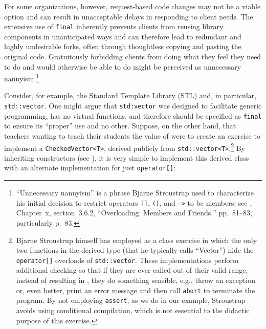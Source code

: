 {For some organizations, however, request-based code changes may not be a
viable option and can result in unacceptable delays in responding to
client needs. The extensive use of \lstinline!final! inherently prevents
clients from reusing library components in unanticipated ways and can
therefore lead to redundant and highly undesirable forks, often through
thoughtless copying and pasting the original code. Gratuitously
forbidding clients from doing what they feel they need to do and would
otherwise be able to do might be perceived as unnecessary
nannyism.{\cprotect\footnote{``Unnecessary nannyism'' is a phrase Bjarne
Stroustrup used to characterize his initial decision to restrict
operators \lstinline![]!, \lstinline!()!, and \lstinline!->! to be members; see
\cite{stroustrup94}, Chapter~x, section~3.6.2, ``Overloading: Members and
Friends,'' pp.~81--83, particularly p.~83.
%  
}}

Consider, for example, the Standard Template Library (STL) and, in
particular, \lstinline!std::vector!. One might argue that
\lstinline!std:vector! was designed to facilitate generic programming, has
no virtual functions, and therefore should be specified as
\lstinline!final! to ensure its ``proper'' use and no other. Suppose, on
the other hand, that teachers wanting to teach their students the value
of  were to create an exercise to
implement a \lstinline!CheckedVector<T>!, derived publicly from
\lstinline!std::vector<T>!.{\cprotect\footnote{Bjarne Stroustrup himself
has employed as a class exercise in which the only two functions in
the derived type (that he typically calls ``Vector'') hide the
\lstinline!operator[]! overloads of \lstinline!std::vector!. These
implementations perform additional checking so that if they are ever
called out of their valid range, instead of resulting in
, they do something sensible, e.g., throw
an exception or, even better, print an error message and then call
\lstinline!abort! to terminate the program. By not employing
\lstinline!assert!, as we do in our example, Stroustrup avoids using
conditional compilation, which is not essential to the didactic
  purpose of this exercise.}} By inheriting constructors (see
), it is very simple to implement
this derived class with an alternate implementation for just
\lstinline!operator[]!:

}
